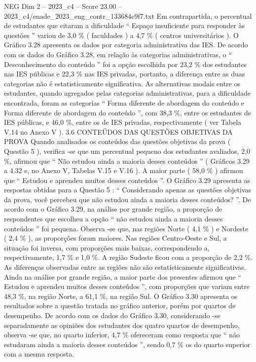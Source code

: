 \begin{textsample}{NEG Dim 2 – 2023\_c4 – Score 23.00 – 2023\_c4/enade\_2023\_eng\_contr\_133684c9f7.txt}
Em contrapartida, o percentual de estudantes que citaram a dificuldade “ Espaço insuficiente para responder às questões ” variou de 3,0 \% ( faculdades ) a 4,7 \% ( centros universitários ).
O Gráfico 3.28 apresenta os dados por categoria administrativa das IES.
De acordo com os dados do Gráfico 3.28, em relação às categorias administrativas, o “ Desconhecimento do conteúdo ” foi a opção escolhida por 23,2 \% dos estudantes nas IES públicas e 22,3 \% nas IES privadas, portanto, a diferença entre as duas categorias não é estatisticamente significativa.
As alternativas modais entre os estudantes, quando agregados pelas categorias administrativas, para a dificuldade encontrada, foram as categorias “ Forma diferente de abordagem do conteúdo e Forma diferente de abordagem do conteúdo ”, com 38,3 \%, entre os estudantes de IES públicas, e 46,0 \%, entre os de IES privadas, respectivamente ( ver Tabela V.14 no Anexo V ). 3.6 CONTEÚDOS DAS QUESTÕES OBJETIVAS DA PROVA Quando analisados os conteúdos das questões objetivas da prova ( Questão 5 ), verifica -se que um percentual pequeno dos estudantes avaliados, 2,0 \%, afirmou que “ Não estudou ainda a maioria desses conteúdos ” ( Gráficos 3.29 a 4.32 e, no Anexo V, Tabelas V.15 e V.16 ).
A maior parte ( 58,0 \% ) afirmou que “ Estudou e aprendeu muitos desses conteúdos ”.
O Gráfico 3.29 apresenta as respostas obtidas para a Questão 5 : “ Considerando apenas as questões objetivas da prova, você percebeu que não estudou ainda a maioria desses conteúdos? ”.
De acordo com o Gráfico 3.29, na análise por grande região, a proporção de respondentes que escolheu a opção “ não estudou ainda a maioria desses conteúdos ” foi pequena.
Observa -se que, nas regiões Norte ( 4,1 \% ) e Nordeste ( 2,4 \% ), as proporções foram maiores.
Nas regiões Centro-Oeste e Sul, a situação foi inversa, com proporções mais baixas, correspondendo a, respectivamente, 1,7 \% e 1,0 \%.
A região Sudeste ficou com a proporção de 2,2 \%.
As diferenças observadas entre as regiões não são estatisticamente significativas.
Ainda na análise por grande região, a maior parte dos presentes afirmou que “ Estudou e aprendeu muitos desses conteúdos ”, com proporções que variam entre 48,3 \%, na região Norte, a 61,1 \%, na região Sul.
O Gráfico 3.30 apresenta os resultados sobre a questão tratada no gráfico anterior, porém por quartos de desempenho.
De acordo com os dados do Gráfico 3.30, considerando -se separadamente as opiniões dos estudantes dos quatro quartos de desempenho, observa -se que, no quarto inferior, 4,7 \% ofereceram como resposta que “ não estudaram ainda a maioria desses conteúdos ”, sendo 0,7 \% os do quarto superior com a mesma resposta.

\end{textsample}
